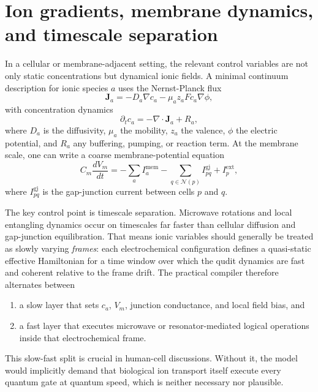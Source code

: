 \documentclass[11pt]{report}
\theoremstyle{definition}
\begin{document}
\section{Ion gradients, membrane dynamics, and timescale separation}
In a cellular or membrane-adjacent setting, the relevant control variables are not only static concentrations but dynamical ionic fields. A minimal continuum description for ionic species $a$ uses the Nernst-Planck flux
\begin{equation}
\mathbf{J}_a = -D_a \nabla c_a - \mu_a z_a F c_a \nabla \phi,
\end{equation}
with concentration dynamics
\begin{equation}
\partial_t c_a = -\nabla \cdot \mathbf{J}_a + R_a,
\end{equation}
where $D_a$ is the diffusivity, $\mu_a$ the mobility, $z_a$ the valence, $\phi$ the electric potential, and $R_a$ any buffering, pumping, or reaction term. At the membrane scale, one can write a coarse membrane-potential equation
\begin{equation}
C_m \frac{dV_m}{dt}
=
-\sum_a I_a^{\mathrm{mem}}
-\sum_{q \in \mathcal{N}(p)} I_{pq}^{\mathrm{gj}}
+I_p^{\mathrm{ext}},
\end{equation}
where $I_{pq}^{\mathrm{gj}}$ is the gap-junction current between cells $p$ and $q$.

The key control point is timescale separation. Microwave rotations and local entangling dynamics occur on timescales far faster than cellular diffusion and gap-junction equilibration. That means ionic variables should generally be treated as slowly varying \emph{frames}: each electrochemical configuration defines a quasi-static effective Hamiltonian for a time window over which the qudit dynamics are fast and coherent relative to the frame drift. The practical compiler therefore alternates between

\begin{enumerate}[leftmargin=2em]
\item a slow layer that sets $c_a$, $V_m$, junction conductance, and local field bias, and
\item a fast layer that executes microwave or resonator-mediated logical operations inside that electrochemical frame.
\end{enumerate}

This slow-fast split is crucial in human-cell discussions. Without it, the model would implicitly demand that biological ion transport itself execute every quantum gate at quantum speed, which is neither necessary nor plausible.
\end{document}
